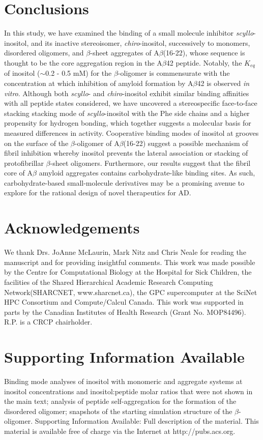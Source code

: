 \section{Conclusions}
In this study, we have examined the binding of a small molecule inhibitor \emph{scyllo}-inositol, and its inactive stereoisomer, \emph{chiro}-inositol, successively to monomers, disordered oligomers, and $\beta$-sheet aggregates of A$\beta$(16-22), whose sequence is thought to be the core aggregation region in the A$\beta$42 peptide. Notably, the $K_{eq}$ of inositol ($\sim$0.2 - 0.5 mM) for the $\beta$-oligomer is commensurate with the concentration at which inhibition of amyloid formation by A$\beta$42 is observed \emph{in vitro}. Although both \emph{scyllo}- and \emph{chiro}-inositol exhibit similar binding affinities with all peptide states considered, we have uncovered a stereospecific face-to-face stacking stacking mode of \emph{scyllo}-inositol with the Phe side chains and a higher propensity for hydrogen bonding, which together suggests a molecular basis for measured differences in activity.  Cooperative binding modes of inositol at grooves on the surface of the $\beta$-oligomer of A$\beta$(16-22) suggest a possible mechanism of fibril inhibition whereby inositol prevents the lateral association or stacking of protofibrillar $\beta$-sheet oligomers. Furthermore, our results suggest that the fibril core of A$\beta$ amyloid aggregates contains carbohydrate-like binding sites. As such, carbohydrate-based small-molecule derivatives may be a promising avenue to explore for the rational design of novel therapeutics for AD.

\section*{Acknowledgements}
We thank Drs. JoAnne McLaurin, Mark Nitz and Chris Neale for reading the manuscript and for providing insightful comments. This work was made possible by the Centre for Computational Biology at the Hospital for Sick Children, the facilities of the Shared Hierarchical Academic Research Computing Network(SHARCNET, www.sharcnet.ca), the GPC supercomputer at the SciNet HPC Consortium and Compute/Calcul Canada. This work was supported in parts by the Canadian Institutes of Health Research (Grant No. MOP84496). R.P. is a CRCP chairholder.

\section*{Supporting Information Available}
Binding mode analyses of inositol with monomeric and aggregate systems at inositol concentrations and inositol:peptide molar ratios that were not shown in the main text; analysis of peptide self-aggregation for the formation of the disordered oligomer; snapshots of the starting simulation structure of the $\beta$-oligomer. Supporting Information Available: Full description of the material. This material is available free of charge via the Internet at http://pubs.acs.org.

